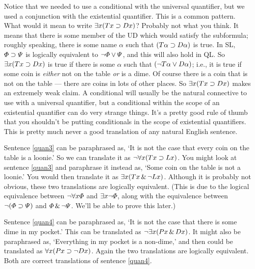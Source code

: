 Notice that we needed to use a conditional with the universal quantifier, but we used a conjunction with the existential quantifier. This is a common pattern. What would it mean to write $\exists x(Tx \supset Dx)$? Probably not what you think. It means that there is some member of the UD which would satisfy the subformula; roughly speaking, there is some name $\alpha$ such that $(T\alpha \supset D\alpha)$ is true. In SL, $\varPhi{} \supset \varPsi{}$ is logically equivalent to $\neg\varPhi{} \vee \varPsi{}$, and this will also hold in QL. So $\exists x(Tx \supset Dx)$ is true if there is some $\alpha$ such that $(\neg T\alpha \vee D\alpha)$; i.e., it is true if some coin is \emph{either} not on the table \emph{or} is a dime. Of course there is a coin that is not on the table --- there are coins in lots of other places. So $\exists x(Tx \supset Dx)$ makes an extremely weak claim. A conditional will usually be the natural connective to use with a universal quantifier, but a conditional within the scope of an existential quantifier can do very strange things. It's a pretty good rule of thumb that you shouldn't be putting conditionals in the scope of existential quantifiers. This is pretty much never a good translation of any natural English sentence.

Sentence \ref{quan3} can be paraphrased as, `It is not the case that every coin on the table is a loonie.' So we can translate it as $\neg \forall x(Tx \supset Lx)$. You might look at sentence \ref{quan3} and paraphrase it instead as, `Some coin on the table is not a loonie.' You would then translate it as $\exists x(Tx \,\&\, \neg Lx)$. Although it is probably not obvious, these two translations are logically equivalent. (This is due to the logical equivalence between $\neg\forall x\varPhi{}$ and $\exists x\neg\varPhi{}$, along with the equivalence between $\neg(\varPhi{}\supset\varPsi{})$ and $\varPhi{}\,\&\,\neg\varPsi{}$. We'll be able to prove this later.)

Sentence \ref{quan4} can be paraphrased as, `It is not the case that there is some dime in my pocket.' This can be translated as $\neg\exists x(Px \,\&\, Dx)$. It might also be paraphrased as, `Everything in my pocket is a non-dime,' and then could be translated as $\forall x(Px \supset \neg Dx)$. Again the two translations are logically equivalent. Both are correct translations of sentence \ref{quan4}.

